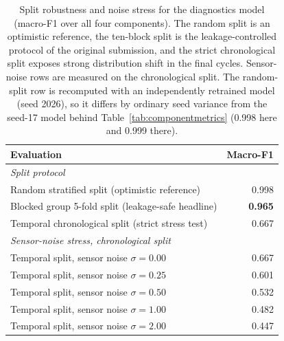 \begin{table}[t]
\centering
\caption{Split robustness and noise stress for the diagnostics model (macro-F1 over all four components). The random split is an optimistic reference, the ten-block split is the leakage-controlled protocol of the original submission, and the strict chronological split exposes strong distribution shift in the final cycles. Sensor-noise rows are measured on the chronological split. The random-split row is recomputed with an independently retrained model (seed 2026), so it differs by ordinary seed variance from the seed-17 model behind Table~\ref{tab:componentmetrics} (0.998 here and 0.999 there).}
\label{tab:leakage_robustness}
\begin{tabular}{lr}
\toprule
Evaluation & Macro-F1 \\
\midrule
\multicolumn{2}{l}{\emph{Split protocol}} \\
Random stratified split (optimistic reference) & 0.998 \\
Blocked group 5-fold split (leakage-safe headline) & \textbf{0.965} \\
Temporal chronological split (strict stress test) & 0.667 \\
\midrule
\multicolumn{2}{l}{\emph{Sensor-noise stress, chronological split}} \\
Temporal split, sensor noise $\sigma=0.00$ & 0.667 \\
Temporal split, sensor noise $\sigma=0.25$ & 0.601 \\
Temporal split, sensor noise $\sigma=0.50$ & 0.532 \\
Temporal split, sensor noise $\sigma=1.00$ & 0.482 \\
Temporal split, sensor noise $\sigma=2.00$ & 0.447 \\
\bottomrule
\end{tabular}
\end{table}
